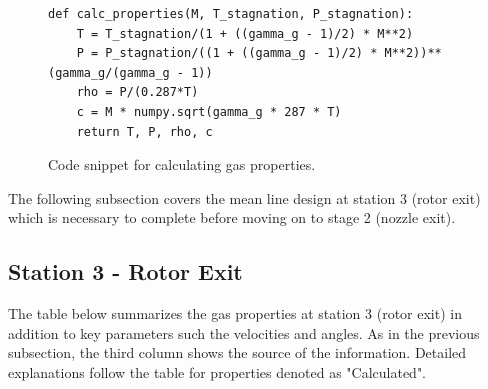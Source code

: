 \documentclass[12pt, letter]{report}
\begin{document}
\begin{figure}[H]
    \begin{verbatim}
def calc_properties(M, T_stagnation, P_stagnation):
    T = T_stagnation/(1 + ((gamma_g - 1)/2) * M**2)
    P = P_stagnation/((1 + ((gamma_g - 1)/2) * M**2))**(gamma_g/(gamma_g - 1))
    rho = P/(0.287*T)
    c = M * numpy.sqrt(gamma_g * 287 * T) 
    return T, P, rho, c
    \end{verbatim}
    \caption{Code snippet for calculating gas properties.}
    \label{fig:code_gas_properties}
\end{figure}
\par
The following subsection covers the mean line design at station 3 (rotor exit) which is necessary to complete before moving on to stage 2 (nozzle exit). 

\subsection{Station 3 - Rotor Exit}
The table below summarizes the gas properties at station 3 (rotor exit) in addition to key parameters such the velocities and angles. As in the previous subsection, the third column shows the source of the information. Detailed explanations follow the table for properties denoted as "Calculated". \par
\end{document}

